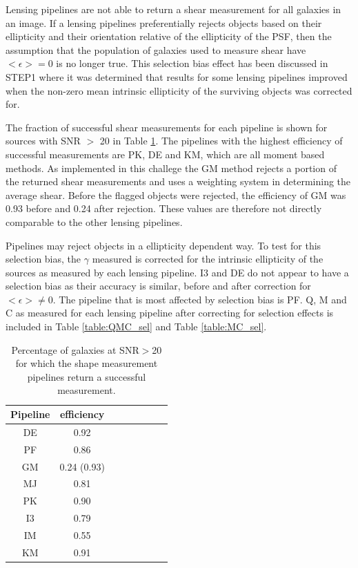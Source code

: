 Lensing pipelines are not able to return 
a shear measurement for all galaxies in an
image. If a lensing pipelines preferentially rejects 
objects based on their ellipticity and their orientation relative of the ellipticity of the PSF, then the assumption that the population of galaxies used to
measure shear have $< \epsilon > = 0 $ is no longer true. 
This selection bias effect has been discussed in STEP1 
where it was determined that results for some lensing pipelines  
improved when the non-zero mean intrinsic ellipticity of the surviving 
objects was corrected for.

The fraction of successful shear measurements
 for each pipeline is shown for sources with SNR $>$ 20 in Table \ref{table:sur_sel}.
The pipelines with the highest efficiency of successful measurements
are PK, DE and KM, which are all moment based methods. 
As implemented in this challege the GM method
rejects a portion of the returned shear measurements and 
uses a weighting system in determining the average shear. Before the
flagged objects were rejected, the efficiency of GM was 0.93 before and 0.24 after rejection. These values are
therefore not directly comparable to the other lensing pipelines. 

Pipelines may reject objects in a ellipticity dependent way. To test
for this selection bias, the $\gamma$ measured is corrected for
the intrinsic ellipticity of the sources as measured by each lensing
pipeline. I3 and DE do not appear to have a selection bias as their
accuracy is similar, before and after correction for $< \epsilon > \neq 0 $. The
pipeline that is most affected by selection bias is PF. Q, M and C as measured for each
lensing pipeline after correcting for selection effects is included in
Table \ref{table:QMC_sel} and Table \ref{table:MC_sel}.  


\begin{table}
        \centering
        \begin{tabular}{|c|c|c|c|c|c|c|c|}  
          \hline
          Pipeline  &  efficiency \\
          \hline \hline
          DE &  0.92 \\
          \hline
          PF & 0.86 \\
          \hline
          GM & 0.24 (0.93) \\
          \hline
          MJ & 0.81 \\
          \hline
          PK & 0.90 \\
          \hline
          I3 &  0.79 \\
          \hline
          IM &  0.55 \\
          \hline
          KM & 0.91 \\
          \hline
        \end{tabular}
        \caption{Percentage of galaxies at SNR$>$20 for which the shape measurement pipelines return a successful measurement.}
    \label{table:sur_sel}
\end{table}




